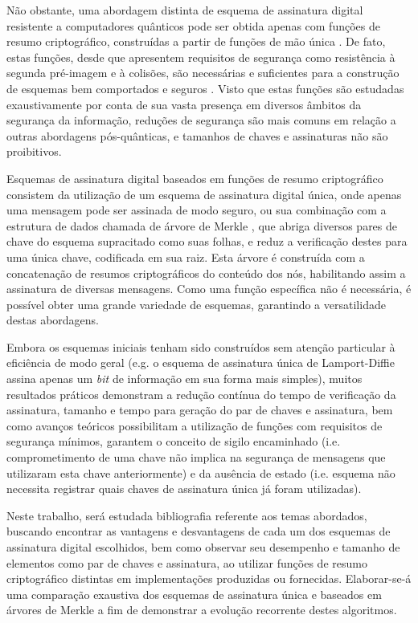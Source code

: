 \documentclass[12pt]{report}
\begin{document}
Não obstante, uma abordagem distinta de esquema de assinatura digital
resistente a computadores quânticos pode ser obtida apenas com funções de
resumo criptográfico, construídas a partir de funções de mão única
\cite{cryptoeprint:2005:328}. De fato, estas funções, desde que apresentem
requisitos de segurança como resistência à segunda pré-imagem e à colisões, são
necessárias e suficientes para a construção de esquemas bem comportados e
seguros \cite{Rompel:1990:OFN:100216.100269}. Visto que estas funções são
estudadas exaustivamente por conta de sua vasta presença em diversos âmbitos da
segurança da informação, reduções de segurança são mais comuns em relação a
outras abordagens pós-quânticas, e tamanhos de chaves e assinaturas não são
proibitivos.

Esquemas de assinatura digital baseados em funções de resumo criptográfico
consistem da utilização de um esquema de assinatura digital única, onde apenas
uma mensagem pode ser assinada de modo seguro, ou sua combinação com a
estrutura de dados chamada de árvore de Merkle
\cite{Merkle:1989:CDS:118209.118230}, que abriga diversos pares de chave do
esquema supracitado como suas folhas, e reduz a verificação destes para uma
única chave, codificada em sua raiz. Esta árvore é construída com a
concatenação de resumos criptográficos do conteúdo dos nós, habilitando assim a
assinatura de diversas mensagens. Como uma função específica não é necessária,
é possível obter uma grande variedade de esquemas, garantindo a versatilidade
destas abordagens.

Embora os esquemas iniciais tenham sido construídos sem atenção particular à
eficiência de modo geral (e.g. o esquema de assinatura única de Lamport-Diffie
\cite{Lamport1979} assina apenas um \emph{bit} de informação em sua forma mais
simples), muitos resultados práticos demonstram a redução contínua do tempo de
verificação da assinatura, tamanho e tempo para geração do par de chaves e
assinatura, bem como avanços teóricos possibilitam a utilização de funções com
requisitos de segurança mínimos, garantem o conceito de sigilo encaminhado
\cite{Buchmann:2011:XPF:2184003.2184011} (i.e. comprometimento de uma chave não
implica na segurança de mensagens que utilizaram esta chave anteriormente) e da
ausência de estado \cite{Bernstein2015} (i.e. esquema não necessita registrar
quais chaves de assinatura única já foram utilizadas).

Neste trabalho, será estudada bibliografia referente aos temas abordados,
buscando encontrar as vantagens e desvantagens de cada um dos esquemas
de assinatura digital escolhidos, bem como observar seu desempenho e tamanho
de elementos como par de chaves e assinatura, ao utilizar funções de resumo
criptográfico distintas em implementações produzidas ou fornecidas.
Elaborar-se-á uma comparação exaustiva dos esquemas de assinatura única e
baseados em árvores de Merkle a fim de demonstrar a evolução recorrente
destes algoritmos.
\end{document}

